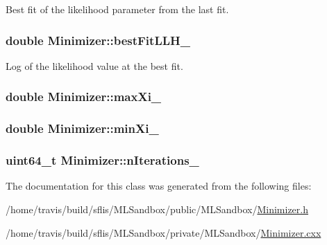 Best fit of the likelihood parameter from the last fit. 

\hypertarget{classMinimizer_ace3797e38fc23cf74bf05a3b1c3cdc36}{
\subsubsection[{best\-Fit\-L\-L\-H\-\_\-}]{\setlength{\rightskip}{0pt plus 5cm}double Minimizer\-::best\-Fit\-L\-L\-H\-\_\-}}\label{classMinimizer_ace3797e38fc23cf74bf05a3b1c3cdc36}


Log of the likelihood value at the best fit. 

\hypertarget{classMinimizer_af45f99d12232ed7f056ad16182392752}{
\subsubsection[{max\-Xi\-\_\-}]{\setlength{\rightskip}{0pt plus 5cm}double Minimizer\-::max\-Xi\-\_\-}}\label{classMinimizer_af45f99d12232ed7f056ad16182392752}
\hypertarget{classMinimizer_afb5a706ff1374955187d666634f2ac63}{
\subsubsection[{min\-Xi\-\_\-}]{\setlength{\rightskip}{0pt plus 5cm}double Minimizer\-::min\-Xi\-\_\-}}\label{classMinimizer_afb5a706ff1374955187d666634f2ac63}
\hypertarget{classMinimizer_ac2b79419b1d5230732bdf9c3f4ead23e}{
\subsubsection[{n\-Iterations\-\_\-}]{\setlength{\rightskip}{0pt plus 5cm}uint64\-\_\-t Minimizer\-::n\-Iterations\-\_\-}}\label{classMinimizer_ac2b79419b1d5230732bdf9c3f4ead23e}


The documentation for this class was generated from the following files\-:\begin{DoxyCompactItemize}
\item 
/home/travis/build/sflis/\-M\-L\-Sandbox/public/\-M\-L\-Sandbox/\hyperlink{Minimizer_8h}{Minimizer.\-h}\item 
/home/travis/build/sflis/\-M\-L\-Sandbox/private/\-M\-L\-Sandbox/\hyperlink{MLSandbox_2Minimizer_8cxx}{Minimizer.\-cxx}\end{DoxyCompactItemize}
